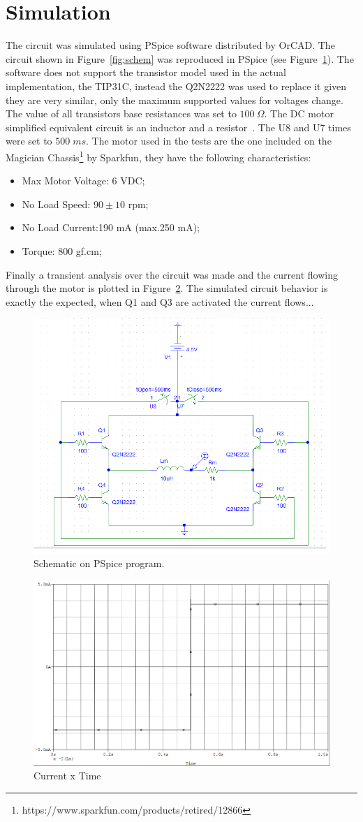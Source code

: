 \section{\textbf{Simulation}}\label{sec:3}

    The circuit was simulated using PSpice software distributed by OrCAD. The circuit shown in Figure~\ref{fig:schem} was reproduced in PSpice (see Figure~\ref{fig:pspice}). The software does not support the transistor model used in the actual implementation, the TIP31C, instead the Q2N2222 was used to replace it given they are very similar, only the maximum supported values for voltages change. The value of all transistors base resistances was set to $100\:\Omega$. The DC motor simplified equivalent circuit is an inductor and a resistor~\cite{CHAPMAN}. The U8 and U7 times were set to $500\; ms$.\newline
    The motor used in the tests are the one included on the Magician Chassis\footnote{https://www.sparkfun.com/products/retired/12866} by Sparkfun, they have the following characteristics:
    \begin{itemize}
    \item Max Motor Voltage: 6 VDC;
    \item No Load Speed: $90\pm10$ rpm;
    \item No Load Current:190 mA (max.250 mA);
    \item Torque: 800 gf.cm;
    \end{itemize}
	Finally a transient analysis over the circuit was made and the current flowing through the motor is plotted in Figure~\ref{fig:plot_ponteh}. The simulated circuit behavior is exactly the expected, when Q1 and Q3 are activated the current flows... 

\begin{figure}
\centering
\includegraphics[height=.4\textwidth]{img/schem_pspice.png}
\caption{Schematic on PSpice program.}\label{fig:pspice}%
\end{figure}
	
\begin{figure}
\centering
\includegraphics[height=.3\textwidth]{img/plot.png}
\caption{Current x Time} \label{fig:plot_ponteh}
\end{figure}	


